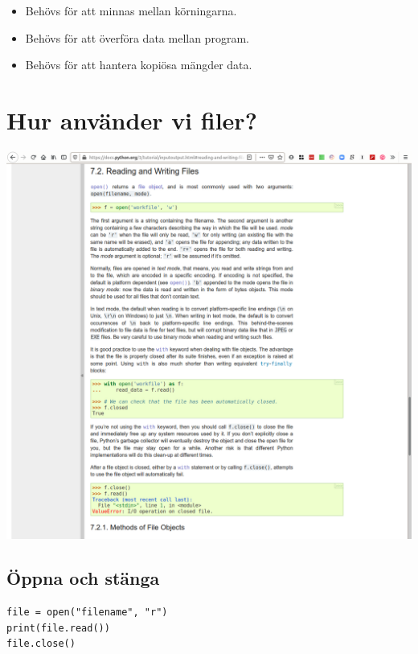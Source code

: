 \begin{frame}
  \begin{remark}
    \begin{itemize}
      \item Behövs för att minnas mellan körningarna.
      \item Behövs för att överföra data mellan program.
      \item Behövs för att hantera kopiösa mängder data.
    \end{itemize}
  \end{remark}
\end{frame}


\section{Hur använder vi filer?}

\begin{frame}
  \includegraphics[width=\columnwidth]{figs/docs-files.png}
\end{frame}

\subsection{Öppna och stänga}

\begin{frame}[fragile]
  \begin{verbatim}
file = open("filename", "r")
print(file.read())
file.close()
  \end{verbatim}
\end{frame}

